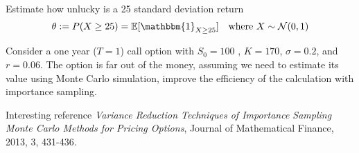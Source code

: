 \documentclass[12pt,a4paper]{article}
\begin{document}
\begin{question}
Estimate how unlucky is a 25 standard deviation return
\begin{equation*}
\theta := P(X\geq 25) = \mathbb{E}[\mathbbm{1}_{X\geq 25}]  \quad\text{where } X\sim \mathcal{N}(0, 1)
\end{equation*}
\end{question}

\begin{question}
Consider a one year ($T=1$) call option with $S_0=100$ , $K=170$,  $\sigma=0.2$, and $r=0.06$. The option is far out of the money, assuming we need to estimate its value using Monte Carlo simulation, improve the efficiency of the calculation with importance sampling.

\noindent
Interesting reference \emph{Variance Reduction Techniques of Importance Sampling Monte Carlo Methods for Pricing Options}, 
Journal of Mathematical Finance, 2013, 3, 431-436.
\end{question}

\clearpage
\tableofcontents
\end{document}
